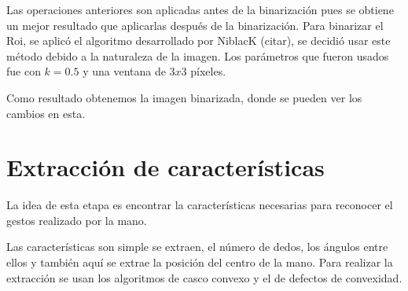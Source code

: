 Las operaciones anteriores son aplicadas antes de la binarizaci\'on pues se obtiene un mejor resultado que aplicarlas después de la binarizaci\'on.  
Para binarizar el Roi, se aplic\'o el algoritmo desarrollado por NiblacK (citar), se decidió usar este método debido a la naturaleza de la imagen. Los parámetros que fueron usados fue con $k=0.5$ y una ventana de $3x3$ p\'ixeles. 

Como resultado obtenemos la imagen binarizada, donde se pueden ver los cambios en esta.
 



\section{Extracci\'on de caracter\'isticas}\label{sec:ExtraccionCaracteristicas}

La idea de esta etapa es encontrar la  características necesarias para reconocer el gestos realizado por la mano.  

Las características  son simple se extraen, el n\'umero de dedos, los ángulos entre ellos y también aquí se extrae la posición del centro de la mano. 
Para realizar la extracción se usan los algoritmos de casco convexo y el de defectos de convexidad.  
 

